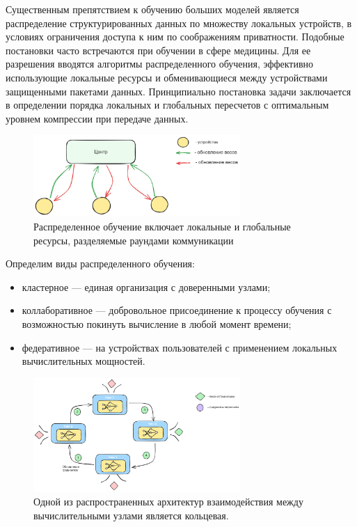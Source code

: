 Существенным препятствием к обучению больших моделей является распределение структурированных данных по множеству
локальных устройств, в условиях ограничения доступа к ним по соображениям приватности. Подобные постановки часто встречаются
при обучении в сфере медицины. Для ее разрешения вводятся алгоритмы распределенного обучения, эффективно использующие
локальные ресурсы и обменивающиеся между устройствами защищенными пакетами данных. Принципиально постановка задачи
заключается в определении порядка локальных и глобальных пересчетов с оптимальным уровнем компрессии при передаче данных.

\begin{figure}[h]
    \centering
    \includegraphics[width=0.7\textwidth]{assets/math/distributed/distributed.excalidraw.png}
    \caption{Распределенное обучение включает локальные и глобальные ресурсы, разделяемые раундами коммуникации }
    \label{distributed}
\end{figure}

Определим виды распределенного обучения:
 \begin{itemize}
    \item кластерное --- единая организация с доверенными узлами;
    \item коллаборативное --- добровольное присоединение к процессу обучения с возможностью покинуть 
          вычисление в любой момент времени;
    \item федеративное --- на устройствах пользователей с применением локальных вычислительных мощностей.
\end{itemize}

\begin{figure}[h]
    \centering
    \includegraphics[width=0.7\textwidth]{assets/math/distributed/ring.excalidraw.png}
    \caption{Одной из распространенных архитектур взаимодействия между вычислительными узлами является кольцевая.}
    \label{ring}
\end{figure}

